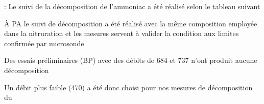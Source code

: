 \documentclass[aspectratio=169,pdf,t]{beamer}
\begin{document}
\begin{frame}{\insertsection}{\insertsubsection: }
	Le suivi de la décomposition de l'ammoniac a été réalisé selon le tableau suivant
	
	\vfill{}
  
  \vfill{}
  À PA le suivi de décomposition a été réalisé avec la même composition employée dans la nitruration et les mesures servent à valider la condition aux limites confirmée par microsonde
  
  \vfill{}
  Des essais préliminaires (BP) avec des débits de \SI{684}{\sccm} et \SI{737}{\sccm} n'ont produit aucune décomposition
  
  \vfill{}
  Un d\'ebit plus faible (\SI{470}{\sccm}) a \'et\'e donc choisi pour nos mesures de d\'ecomposition du 
\end{frame}	
\end{document}
